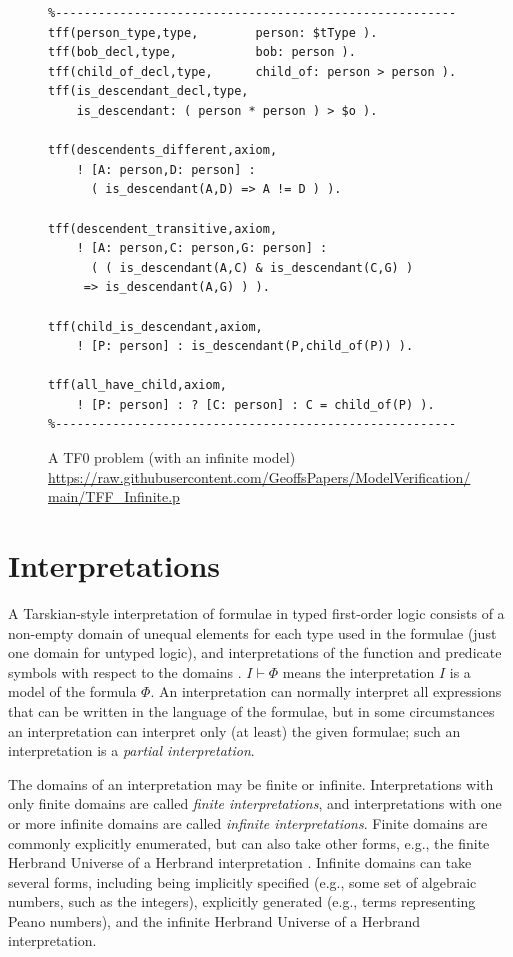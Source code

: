 \documentclass{easychair}
\begin{document}
\begin{figure}[htbp]
\small
{}
\begin{verbatim}
%--------------------------------------------------------
tff(person_type,type,        person: $tType ).
tff(bob_decl,type,           bob: person ).
tff(child_of_decl,type,      child_of: person > person ).
tff(is_descendant_decl,type, 
    is_descendant: ( person * person ) > $o ).

tff(descendents_different,axiom,
    ! [A: person,D: person] : 
      ( is_descendant(A,D) => A != D ) ).

tff(descendent_transitive,axiom,
    ! [A: person,C: person,G: person] :
      ( ( is_descendant(A,C) & is_descendant(C,G) ) 
     => is_descendant(A,G) ) ).

tff(child_is_descendant,axiom,
    ! [P: person] : is_descendant(P,child_of(P)) ).

tff(all_have_child,axiom,
    ! [P: person] : ? [C: person] : C = child_of(P) ).
%--------------------------------------------------------
\end{verbatim}
\caption{A TF0 problem (with an infinite model)\\
{\footnotesize \url{https://raw.githubusercontent.com/GeoffsPapers/ModelVerification/main/TFF_Infinite.p}}}
\label{TF0InfiniteProblem}
\end{figure}

\section{Interpretations}
\label{Interpretations}

A Tarskian-style interpretation \cite{TV56} of formulae in typed first-order logic consists of a 
non-empty domain of unequal elements for each type used in the formulae (just one domain for 
untyped logic), and interpretations of the function and predicate symbols with respect to the 
domains \cite{Hun96,Gal15}.
$I \vdash \Phi$ means the interpretation $I$ is a model of the formula $\Phi$.
An interpretation can normally interpret all expressions that can be written in the language of 
the formulae, but in some circumstances an interpretation can interpret only (at least) the given 
formulae; such an interpretation is a {\em partial interpretation}.

The domains of an interpretation may be finite or infinite.
Interpretations with only finite domains are called {\em finite interpretations}, and
interpretations with one or more infinite domains are called {\em infinite interpretations}.
Finite domains are commonly explicitly enumerated, but can also take other forms, e.g., the 
finite Herbrand Universe of a Herbrand interpretation \cite{Her30}.
Infinite domains can take several forms, including being implicitly specified (e.g., some set
of algebraic numbers, such as the integers), explicitly generated (e.g., terms representing 
Peano numbers), and the infinite Herbrand Universe of a Herbrand interpretation.
\end{document}
